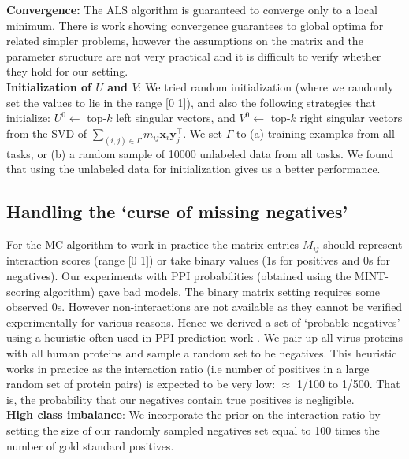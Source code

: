 \documentclass[runningheads,a4paper]{llncs}
\begin{document}
\noindent \textbf{Convergence:} The ALS algorithm is guaranteed to converge only to a local minimum. There is work showing convergence guarantees to global optima for related simpler problems, however the assumptions on the matrix and the parameter structure are not very practical and 
it is difficult to verify whether they hold for our setting. \\
\noindent \textbf{Initialization of $U$ and $V$}: We tried random initialization (where we randomly set the values to lie in the range [0 1]), and also 
the following strategies that initialize: $U^0 \leftarrow$ top-$k$ left singular vectors, and $V^0 \leftarrow$ top-$k$ right singular vectors from 
the SVD of $\displaystyle{\sum_{(i,j) \in \Gamma}} m_{ij} \mathbf{x}_i \mathbf{y}_j^\intercal$. We set $\Gamma$ to 
(a) training examples from all tasks, or (b) a random sample of 10000 unlabeled data from all tasks. We found that using the unlabeled data for initialization gives us a better performance.


\subsection{Handling the `curse of missing negatives'}
\label{negs}
For the MC algorithm to work in practice the matrix entries $M_{ij}$ should represent interaction scores (range [0 1]) 
or take binary values (1s for positives and 0s for negatives). Our experiments with PPI probabilities (obtained using the MINT-scoring algorithm)
gave bad models. The binary matrix setting requires some observed 0s. However non-interactions are not available as they cannot be verified 
experimentally for various reasons. Hence we derived a set of `probable negatives' using a heuristic often used in PPI prediction 
work \cite{qi06,qi09,dyer11,me_ismb_2013}. We pair up all virus proteins with all human proteins and sample a random set to be negatives. 
This heuristic works in practice as the interaction ratio (i.e number of positives in a large random set of protein pairs) is expected to be very low:
$\approx$ 1/100 to 1/500. That is, the probability that our negatives contain true positives is negligible. \\
\textbf{High class imbalance}: We incorporate the prior on the interaction ratio by setting the size of our randomly sampled negatives set equal to
100 times the number of gold standard positives.
\end{document}
